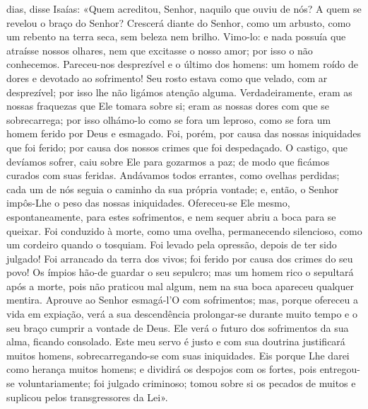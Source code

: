 \begin{paracol}{2}
{ dias, disse Isaías: «Quem acreditou, Senhor, naquilo que ouviu de nós? A quem se revelou o braço do Senhor? Crescerá diante do Senhor, como um arbusto, como um rebento na terra seca, sem beleza nem brilho. Vimo-lo: e nada possuía que atraísse nossos olhares, nem que excitasse o nosso amor; por isso o não conhecemos. Pareceu-nos desprezível e o último dos homens: um homem roído de dores e devotado ao sofrimento! Seu rosto estava como que velado, com ar desprezível; por isso lhe não ligámos atenção alguma. Verdadeiramente, eram as nossas fraquezas que Ele tomara sobre si; eram as nossas dores com que se sobrecarrega; por isso olhámo-lo como se fora um leproso, como se fora um homem ferido por Deus e esmagado. Foi, porém, por causa das nossas iniquidades que foi ferido; por causa dos nossos crimes que foi despedaçado. O castigo, que devíamos sofrer, caiu sobre Ele para gozarmos a paz; de modo que ficámos curados com suas feridas. Andávamos todos errantes, como ovelhas perdidas; cada um de nós seguia o caminho da sua própria vontade; e, então, o Senhor impôs-Lhe o peso das nossas iniquidades. Ofereceu-se Ele mesmo, espontaneamente, para estes sofrimentos, e nem sequer abriu a boca para se queixar. Foi conduzido à morte, como uma ovelha, permanecendo silencioso, como um cordeiro quando o tosquiam. Foi levado pela opressão, depois de ter sido julgado! Foi arrancado da terra dos vivos; foi ferido por causa dos crimes do seu povo! Os ímpios hão-de guardar o seu sepulcro; mas um homem rico o sepultará após a morte, pois não praticou mal algum, nem na sua boca apareceu qualquer mentira. Aprouve ao Senhor esmagá-l’O com sofrimentos; mas, porque ofereceu a vida em expiação, verá a sua descendência prolongar-se durante muito tempo e o seu braço cumprir a vontade de Deus. Ele verá o futuro dos sofrimentos da sua alma, ficando consolado. Este meu servo é justo e com sua doutrina justificará muitos homens, sobrecarregando-se com suas iniquidades. Eis porque Lhe darei como herança muitos homens; e dividirá os despojos com os fortes, pois entregou-se voluntariamente; foi julgado criminoso; tomou sobre si os pecados de muitos e suplicou pelos transgressores da Lei».
}\end{paracol}

